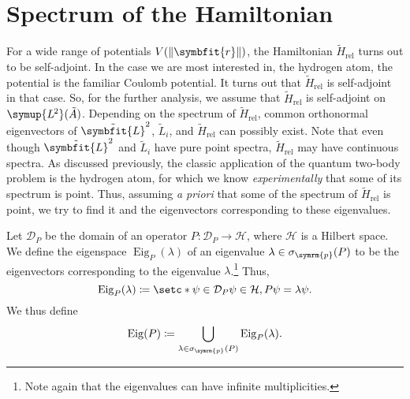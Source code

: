 \documentclass[12pt, a4 paper]{article}
\let\symcal\mathcal
\theoremstyle{definition}
\newcommand{\ltwo}{\symup{L\kern-0.5pt^2}}
\newcommand{\cc}{\symbb{C}}
\newcommand{\nn}{\symbb{N}_0}
\newcommand{\hilbert}{\symcal{H}}
\newcommand{\domain}{\symcal{D}}
\newcommand{\spec}{\sigma}
\newcommand{\rvec}{\symbfit{r}}
\newcommand{\lvecsquare}{\tilde{\symbfit{L}}^2}
\DeclareMathOperator{\spann}{span}
\newcommand{\hrel}{\tilde{H}_\text{rel}}
\newcommand{\eigen}{\operatorname{Eig}}
\newcommand{\ltwoa}{\ltwo(\tilde{A})}
\DeclarePairedDelimiter{\norm}{\lVert}{\rVert}
\begin{document}
    \section{Spectrum of the Hamiltonian}

    For a wide range of potentials \(V(\norm{\rvec})\), the Hamiltonian \(\hrel\) turns out to be self-adjoint. In the case we are most interested in, the hydrogen atom, the potential is the familiar Coulomb potential. It turns out that \(\hrel\) is self-adjoint in that case. So, for the further analysis, we assume that \(\hrel\) is self-adjoint on \(\ltwoa\). Depending on the spectrum of \(\hrel\), common orthonormal eigenvectors of \(\lvecsquare\), \(\tilde{L}_i\), and \(\hrel\) can possibly exist. Note that even though \(\lvecsquare\) and \(\tilde{L}_i\) have pure point spectra, \(\hrel\) may have continuous spectra. As discussed previously, the classic application of the quantum two-body problem is the hydrogen atom, for which we know \textit{experimentally} that some of its spectrum is point. Thus, assuming \textit{a priori} that some of the spectrum of \(\hrel\) is point, we try to find it and the eigenvectors corresponding to these eigenvalues.

    Let \(\domain_P\) be the domain of an operator \(P \colon \domain_P \rightarrow \hilbert\), where \(\hilbert\) is a Hilbert space. We define the eigenspace \(\eigen_P(\lambda)\) of an eigenvalue \(\lambda \in \spec_{\symrm{p}}(P)\) to be the eigenvectors corresponding to the eigenvalue \(\lambda\).\footnote{Note again that the eigenvalues can have infinite multiplicities.} Thus,
    \[
        \eigen_P(\lambda) \coloneq \setc*{\psi \in \domain_P}{\psi \in \hilbert, P\psi = \lambda\psi}.
    \]
    We thus define
    \[
        \eigen(P) \coloneq \bigcup_{\lambda \in \spec_{\symrm{p}}(P)} \eigen_P(\lambda).
    \]
\end{document}
